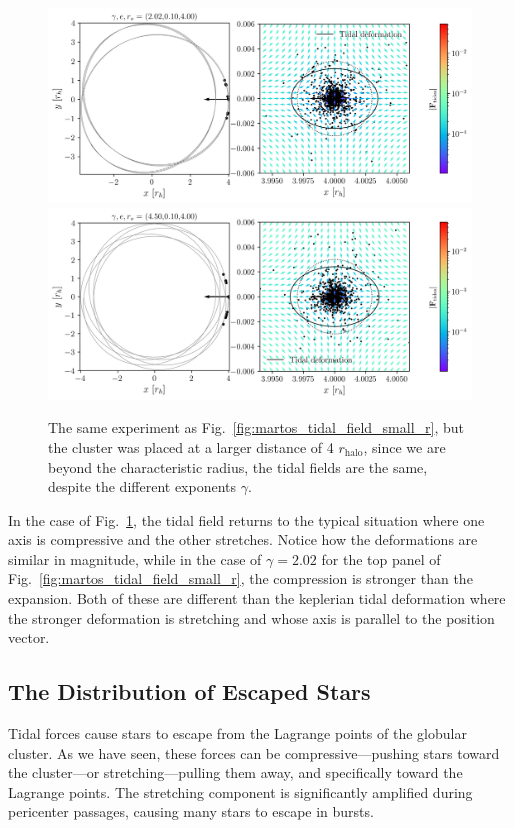             \begin{figure}
                \includegraphics[width=\linewidth]{images/martos_tidal_field_202_10_400.png}
                \includegraphics[width=\linewidth]{images/martos_tidal_field_450_10_400.png}
                \caption{The same experiment as Fig.~\ref{fig:martos_tidal_field_small_r}, but the cluster was placed at a larger distance of 4 $r_\textrm{halo}$, since we are beyond the characteristic radius, the tidal fields are the same, despite the different exponents $\gamma$.}
                \label{fig:martos_tidal_field_big_r}
            \end{figure}
            In the case of Fig.~\ref{fig:martos_tidal_field_big_r}, the tidal field returns to the typical situation where one axis is compressive and the other stretches. Notice how the deformations are similar in magnitude, while in the case of $\gamma=2.02$ for the top panel of Fig.~\ref{fig:martos_tidal_field_small_r}, the compression is stronger than the expansion. Both of these are different than the keplerian tidal deformation where the stronger deformation is stretching and whose axis is parallel to the position vector. 

    \subsection{The Distribution of Escaped Stars}\label{sec:phaseMixing}
        Tidal forces cause stars to escape from the Lagrange points of the globular cluster. As we have seen, these forces can be compressive—pushing stars toward the cluster—or stretching—pulling them away, and specifically toward the Lagrange points. The stretching component is significantly amplified during pericenter passages, causing many stars to escape in bursts.

